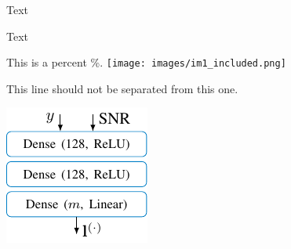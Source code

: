 
Text

Text%


This is a percent \%.
\texttt{[image: images/im1\_included.png]}

This line should not be separated
%
from this one.

\newif\ifvar

\ifvar
\fi




\includegraphics{ext_tikz/test1.pdf}







